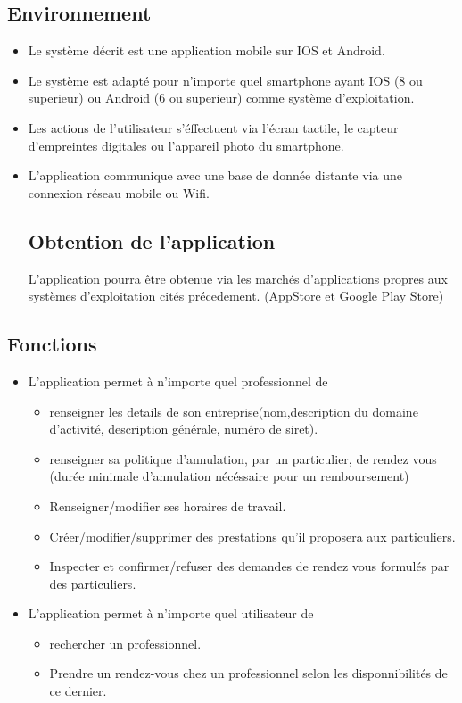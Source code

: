 \documentclass{article}
\begin{document}
\subsection{Environnement}
\begin{itemize}
\item Le système décrit est une application mobile sur IOS et
Android.
\item Le système est adapté pour n'importe quel smartphone ayant IOS (8 ou superieur) ou Android (6 ou superieur) comme
système d'exploitation.
\item Les actions de l'utilisateur s'éffectuent via l'écran
  tactile, le capteur d'empreintes digitales ou l'appareil photo du smartphone.
\item L'application communique avec une base de donnée distante
  via une connexion \og réseau mobile\fg{} ou Wifi.
\subsection{Obtention de l'application}
L'application pourra être obtenue via les marchés d'applications propres aux systèmes d'exploitation cités précedement.
(AppStore et Google Play Store)

\end{itemize}
\subsection{Fonctions}
\begin{itemize}
\item L'application permet à n'importe quel professionnel de

	\begin{itemize}
	\item renseigner les details de son entreprise(nom,description du
	domaine d'activité, description générale, numéro de siret).
	\item renseigner sa politique d'annulation, par un particulier, de rendez vous (durée minimale d'annulation nécéssaire pour un remboursement)
	\item Renseigner/modifier ses horaires de travail.
	\item Créer/modifier/supprimer des prestations qu'il proposera aux particuliers.
	\item Inspecter et confirmer/refuser des demandes de rendez vous formulés par des particuliers.
	\end{itemize}
\item L'application permet à n'importe quel utilisateur de

 	\begin{itemize}
	\item rechercher un professionnel.
	\item Prendre un rendez-vous chez un professionnel selon les disponnibilités de
	ce dernier.
	\end{itemize}
\end{itemize}
\end{document}
